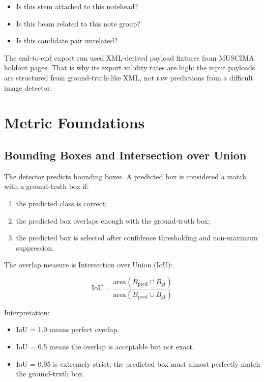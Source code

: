 \documentclass[11pt]{article}
\begin{document}
\begin{itemize}
  \item Is this stem attached to this notehead?
  \item Is this beam related to this note group?
  \item Is this candidate pair unrelated?
\end{itemize}

The end-to-end export run used XML-derived payload fixtures from MUSCIMA holdout pages. That is why its export validity rates are high: the input payloads are structured from ground-truth-like XML, not raw predictions from a difficult image detector.

\section{Metric Foundations}

\subsection{Bounding Boxes and Intersection over Union}

The detector predicts bounding boxes. A predicted box is considered a match with a ground-truth box if:

\begin{enumerate}
  \item the predicted class is correct;
  \item the predicted box overlaps enough with the ground-truth box;
  \item the predicted box is selected after confidence thresholding and non-maximum suppression.
\end{enumerate}

The overlap measure is Intersection over Union (IoU):

\[
\mathrm{IoU} = \frac{\mathrm{area}(B_{\mathrm{pred}} \cap B_{\mathrm{gt}})}
{\mathrm{area}(B_{\mathrm{pred}} \cup B_{\mathrm{gt}})}
\]

Interpretation:

\begin{itemize}
  \item IoU = 1.0 means perfect overlap.
  \item IoU = 0.5 means the overlap is acceptable but not exact.
  \item IoU = 0.95 is extremely strict; the predicted box must almost perfectly match the ground-truth box.
\end{itemize}
\end{document}
